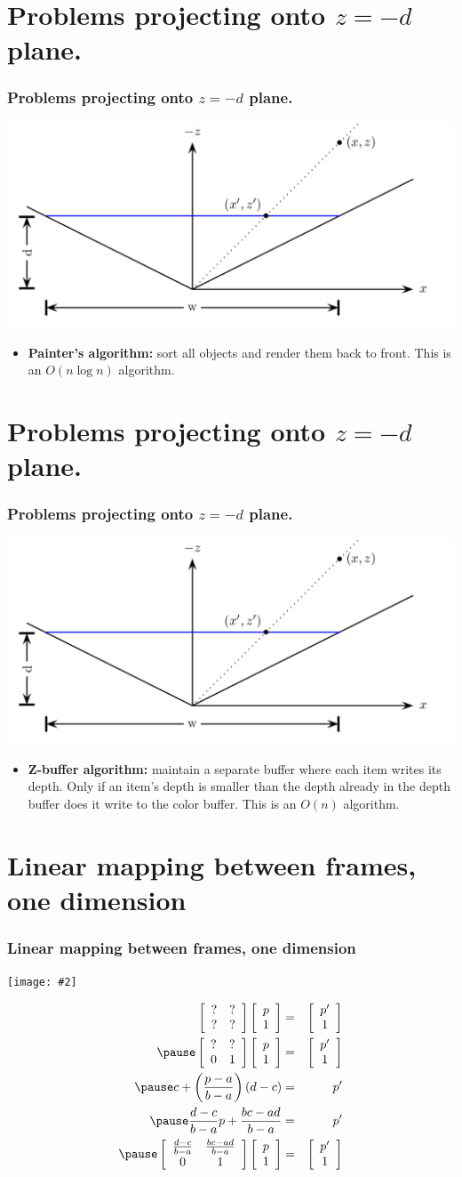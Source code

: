 \documentclass[slidestop,xcolor=pst]{beamer}
\newcommand{\graphc}[2]{\centerline{\texttt{[image: \#2]}}}
\newcommand{\sect}[1]{
\section{#1}
\begin{frame}[fragile]\frametitle{#1}
}
\begin{document}
\sect{Problems projecting onto $z=-d$ plane.}
\includegraphics[width=1\textwidth]{perspective.png}
\begin{itemize}
\item {\bf Painter's algorithm:}  sort all objects and render them
  back to front.  This is an $O(n\log n)$ algorithm.
\end{itemize}
\end{frame}

\sect{Problems projecting onto $z=-d$ plane.}
\includegraphics[width=1\textwidth]{perspective.png}
\begin{itemize}
\item {\bf Z-buffer algorithm:}  maintain a separate buffer where each
  item writes its depth.  Only if an item's depth is smaller than the
  depth already in the depth buffer does it write to the color buffer.
This is an $O(n)$ algorithm.
\end{itemize}
\end{frame}

\sect{Linear mapping between frames, one dimension}
\graphc{1}{onedlinear.png}
\begin{eqnarray*}
\mtwo{?}{?}{?}{?} \vtwo{p}{1} &=& \vtwo{p'}{1}\\
\pause
\mtwo{?}{?}{0}{1} \vtwo{p}{1} &=& \vtwo{p'}{1}\\
\pause
 c + \left(\frac{p-a}{b-a}\right)(d-c) &=& p'\\
\pause
\frac{d-c}{b-a}p + \frac{bc - ad}{b-a} &=& p'\\
\pause
\mtwo{\frac{d-c}{b-a}}{\frac{bc-ad}{b-a}}{0}{1}  \vtwo{p}{1} &=& \vtwo{p'}{1}
\end{eqnarray*}
\end{frame}
\end{document}
